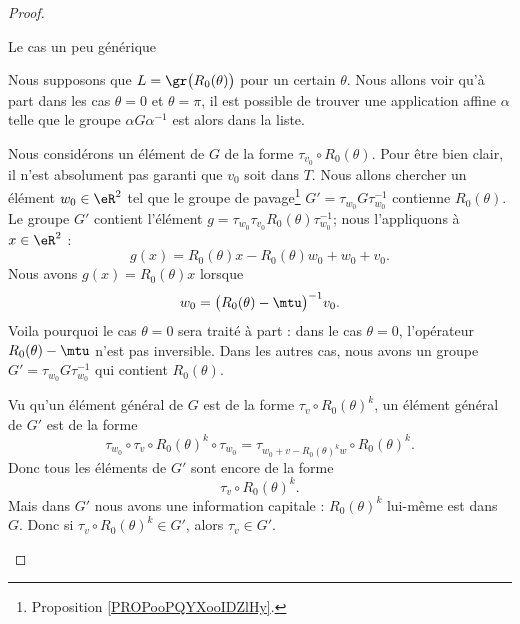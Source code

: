 \begin{proof}
\begin{subproof}
            \item[Le cas un peu générique]

                Nous supposons que \( L=\gr\big( R_0(\theta) \big)\) pour un certain \( \theta\). Nous allons voir qu'à part dans les cas \( \theta=0\) et \( \theta=\pi\), il est possible de trouver une application affine \( \alpha\) telle que le groupe \( \alpha G\alpha^{-1}\) est alors dans la liste.

                Nous considérons un élément de \( G\) de la forme \( \tau_{v_0}\circ R_0(\theta)\). Pour être bien clair, il n'est absolument pas garanti que \( v_0\) soit dans \( T\). Nous allons chercher un élément \( w_0\in \eR^2\) tel que le groupe de pavage\footnote{Proposition \ref{PROPooPQYXooIDZlHy}.} \( G'=\tau_{w_0}G\tau_{w_0}^{-1}\) contienne \( R_0(\theta)\). Le groupe \( G'\) contient l'élément \( g=\tau_{w_0}\tau_{v_0}R_0(\theta)\tau_{w_0}^{-1}\); nous l'appliquons à \( x\in \eR^2\) :
                \begin{equation}
                    g(x)=R_0(\theta)x-R_0(\theta)w_0+w_0+v_0.
                \end{equation}
                Nous avons \( g(x)=R_0(\theta)x\) lorsque
                \begin{equation}
                    w_0=\big( R_0(\theta)-\mtu \big)^{-1}v_0.
                \end{equation}
                Voila pourquoi le cas \( \theta=0\) sera traité à part : dans le cas \( \theta=0\), l'opérateur \( R_0(\theta)-\mtu\) n'est pas inversible. Dans les autres cas, nous avons un groupe \( G'=\tau_{w_0}G\tau_{w_0}^{-1}\) qui contient \( R_0(\theta)\).

                Vu qu'un élément général de \( G\) est de la forme \( \tau_v\circ R_0(\theta)^k\), un élément général de \( G' \) est de la forme
                \begin{equation}
                    \tau_{w_0}\circ \tau_v\circ R_0(\theta)^k\circ \tau_{w_0}=\tau_{w_0+v-R_0(\theta)^kw}\circ R_0(\theta)^k.
                \end{equation}
                Donc tous les éléments de \( G'\) sont encore de la forme
                \begin{equation}
                    \tau_v\circ R_0(\theta)^k.
                \end{equation}
                Mais dans \( G'\) nous avons une information capitale : \( R_0(\theta)^k\) lui-même est dans \( G\). Donc si \( \tau_v\circ R_0(\theta)^k\in G'\), alors \( \tau_v\in G'\).


\end{subproof}
\end{proof}
